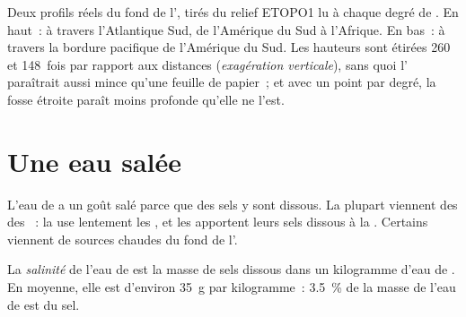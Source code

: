 \begin{omfigure}
{\small Deux profils réels du fond de l', tirés du relief ETOPO1 lu
à chaque degré de . En haut~: à travers l'Atlantique Sud, de
l'Amérique du Sud à l'Afrique. En bas~: à travers la bordure pacifique de
l'Amérique du Sud. Les hauteurs sont étirées 260 et 148~fois par rapport
aux distances (\emph{exagération verticale}), sans quoi l' paraîtrait
aussi mince qu'une feuille de papier~; et avec un point par degré, la
fosse étroite paraît moins profonde qu'elle ne l'est.}
\label{fig:g8:the-oceans:profiles}
\end{omfigure}


\section{Une eau salée}

L'eau de  a un goût salé parce que des sels y sont dissous. La plupart
viennent des  des ~: la  use lentement les , et
les  apportent leurs sels dissous à la . Certains viennent de
sources chaudes du fond de l'.

\begin{definition}[Salinité]\label{def:g8:the-oceans:salinity}
La \emph{salinité} de l'eau de  est la masse de
sels dissous dans un kilogramme d'eau de . En moyenne, elle est
d'environ \qty{35}{g} par kilogramme~: \qty{3.5}{\%} de la masse de l'eau
de  est du sel.
\end{definition}

